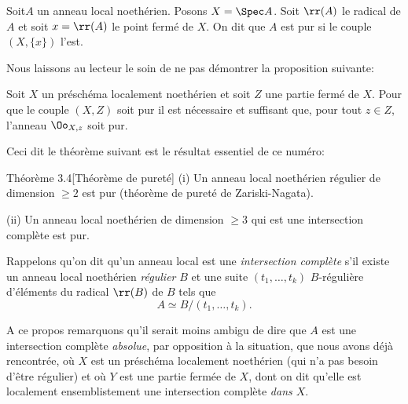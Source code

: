 \begin{definition} \label{X.3.2}
Soit\pageoriginale $A$ un anneau local noeth\'erien. Posons $X=\Spec A$. Soit $\rr(A)$ le radical de $A$ et soit $x=\rr(A)$ le point ferm\'e de $X$. On dit que $A$ est pur si le couple $(X, \{x\})$ l'est.
\end{definition}

Nous laissons au lecteur le soin de ne pas d\'emontrer la proposition suivante:

\begin{proposition} \label{X.3.3}
Soit $X$ un pr\'esch\'ema localement noeth\'erien et soit $Z$ une partie ferm\'e de $X$. Pour que le couple $(X, Z)$ soit pur il est n\'ecessaire et suffisant que, pour tout $z\in Z$, l'anneau $\Oo_{X, z}$ soit pur.
\end{proposition}

Ceci dit le th\'eor\`eme suivant est le r\'esultat essentiel de ce num\'ero:

\label{X.3.4}
\begin{enonce*}{Th\'eor\`eme 3.4}[Th\'eor\`eme de puret\'e\ndemark]
\textup{(i)}\enspace
Un anneau local noeth\'erien r\'egulier de dimension $\geq 2$ est pur (th\'eor\`eme de puret\'e de Zariski-Nagata).

\textup{(ii)}\enspace
Un anneau local noeth\'erien de dimension $\geq 3$ qui est une intersection compl\`ete est pur.
\end{enonce*}

Rappelons qu'on dit qu'un anneau local est une \emph{intersection compl\`ete} s'il existe un anneau local noeth\'erien \emph{r\'egulier} $B$ et une suite $(t_1, \ldots, t_k)$ $B$-r\'eguli\`ere d'\'el\'ements du radical $\rr(B)$ de $B$ tels que
\[
A \simeq B/(t_1, \ldots, t_k).
\]

A ce propos remarquons qu'il serait moins ambigu de dire que $A$ est une intersection compl\`ete \emph{absolue}, par opposition \`a la situation, que nous avons d\'ej\`a rencontr\'ee, o\`u $X$ est un pr\'esch\'ema localement noeth\'erien (qui n'a pas besoin d'\^etre r\'egulier) et o\`u $Y$ est une partie ferm\'ee de $X$, dont on dit qu'elle est \og localement ensemblistement une intersection compl\`ete \emph{dans $X$}\fg.

